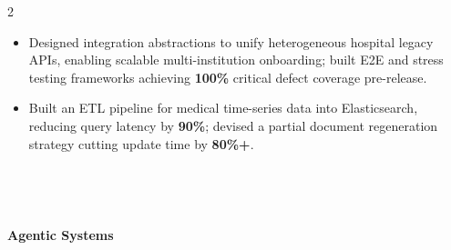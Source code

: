 \documentclass[10pt,a4paper,ragged2e,withhyper]{altacv}
\begin{document}
\begin{paracol}{2}
\begin{itemize}
\end{itemize}

\divider

\begin{itemize}
    \item Designed integration abstractions to unify heterogeneous hospital legacy APIs, enabling scalable multi-institution onboarding; built E2E and stress testing frameworks achieving \textbf{100\%} critical defect coverage pre-release.
    \item Built an ETL pipeline for medical time-series data into Elasticsearch, reducing query latency by \textbf{90\%}; devised a partial document regeneration strategy cutting update time by \textbf{80\%+}.
\end{itemize}

\medskip
{}

{\LaTeXraggedright
{}
\par}

\divider\smallskip

{\LaTeXraggedright
{}
\par}

\divider\smallskip \\

{\LaTeXraggedright
{}
\par}

\divider\smallskip \\
{\LaTeXraggedright
{}
\par}

\medskip

\switchcolumn


\textbf{Agentic Systems} \\
\vspace{0.4em}
  \\
 

\divider\smallskip


\end{paracol}
\end{document}
